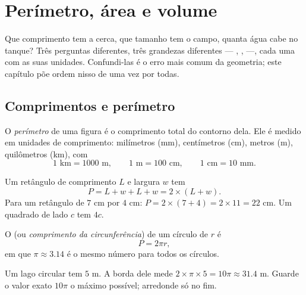 \chapter{Perímetro, área e volume}\label{ch:g6:measure}

Que comprimento tem a cerca, que tamanho tem o campo, quanta água cabe
no tanque? Três perguntas diferentes, três grandezas diferentes ---
, ,  ---, cada uma com as suas unidades. Confundi-las
é o erro mais comum da geometria; este capítulo põe ordem nisso de uma
vez por todas.

\section{Comprimentos e perímetro}

\begin{definition}[Perímetro]\label{def:g6:measure:perimeter}
O \emph{perímetro} de uma figura é o comprimento total
do contorno dela. Ele é medido em unidades de comprimento: milímetros
(mm), centímetros (cm), metros (m), quilômetros (km), com
\[
1 \text{ km} = 1000 \text{ m}, \qquad
1 \text{ m} = 100 \text{ cm}, \qquad
1 \text{ cm} = 10 \text{ mm}.
\]
\end{definition}

\begin{example}\label{ex:g6:measure:perimeter}
Um retângulo de comprimento $L$ e largura $w$ tem 
\[
P = L + w + L + w = 2 \times (L + w).
\]
Para um retângulo de $7$ cm por $4$ cm: $P = 2 \times (7 + 4) =
2 \times 11 = 22$ cm. Um quadrado de lado $c$ tem  $4c$.
\end{example}

\begin{proposition}\label{prop:g6:measure:circle}
O  (ou \emph{comprimento da circunferência}) de um círculo de
 $r$ é
\[
P = 2 \pi r ,
\]
em que $\pi \approx 3.14$ é o mesmo número para todos os círculos.
\end{proposition}
\admitted

\begin{example}
Um lago circular tem  $5$ m. A borda dele mede
$2 \times \pi \times 5 = 10\pi \approx 31.4$ m. Guarde o valor exato
$10\pi$ o máximo possível; arredonde só no fim.
\end{example}

